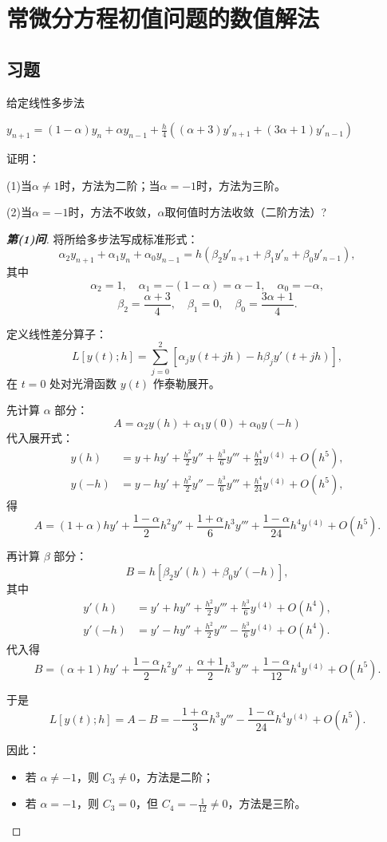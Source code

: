 \documentclass[lang=cn,newtx,12pt,scheme=chinese]{elegantbook}
\begin{document}
\chapter{常微分方程初值问题的数值解法}
\section{习题}
\begin{exercise}
	给定线性多步法
	
	$y_{n+1} =(1-\alpha)y_n+\alpha y_{n-1}+\frac{h}{4}((\alpha+3)y'_{n+1}+(3\alpha+1)y'_{n-1})$
	
	证明：
	
	(1)当$\alpha\neq1$时，方法为二阶；当$\alpha=-1$时，方法为三阶。
	
	(2)当$\alpha=-1$时，方法不收敛，$\alpha$取何值时方法收敛（二阶方法）?
\end{exercise}
\begin{proof}[\textbf{第(1)问}]
	将所给多步法写成标准形式：
	\[
	\alpha_2 y_{n+1} + \alpha_1 y_n + \alpha_0 y_{n-1} = h\left( \beta_2 y'_{n+1} + \beta_1 y'_n + \beta_0 y'_{n-1} \right),
	\]
	其中
	\[
	\alpha_2 = 1,\quad \alpha_1 = -(1-\alpha) = \alpha-1,\quad \alpha_0 = -\alpha,
	\]
	\[
	\beta_2 = \frac{\alpha+3}{4},\quad \beta_1 = 0,\quad \beta_0 = \frac{3\alpha+1}{4}.
	\]
	
	定义线性差分算子：
	\[
	L[y(t);h] = \sum_{j=0}^2 \left[ \alpha_j y(t+jh) - h \beta_j y'(t+jh) \right],
	\]
	在 $t=0$ 处对光滑函数 $y(t)$ 作泰勒展开。
	
	先计算 $\alpha$ 部分：
	\[
	A = \alpha_2 y(h) + \alpha_1 y(0) + \alpha_0 y(-h)
	\]
	代入展开式：
	\begin{align*}
		y(h) &= y + h y' + \frac{h^2}{2} y'' + \frac{h^3}{6} y''' + \frac{h^4}{24} y^{(4)} + O(h^5), \\
		y(-h) &= y - h y' + \frac{h^2}{2} y'' - \frac{h^3}{6} y''' + \frac{h^4}{24} y^{(4)} + O(h^5),
	\end{align*}
	得
	\[
	A = (1+\alpha) h y' + \frac{1-\alpha}{2} h^2 y'' + \frac{1+\alpha}{6} h^3 y''' + \frac{1-\alpha}{24} h^4 y^{(4)} + O(h^5).
	\]
	
	再计算 $\beta$ 部分：
	\[
	B = h\left[ \beta_2 y'(h) + \beta_0 y'(-h) \right],
	\]
	其中
	\begin{align*}
		y'(h) &= y' + h y'' + \frac{h^2}{2} y''' + \frac{h^3}{6} y^{(4)} + O(h^4), \\
		y'(-h) &= y' - h y'' + \frac{h^2}{2} y''' - \frac{h^3}{6} y^{(4)} + O(h^4).
	\end{align*}
	代入得
	\[
	B = (\alpha+1) h y' + \frac{1-\alpha}{2} h^2 y'' + \frac{\alpha+1}{2} h^3 y''' + \frac{1-\alpha}{12} h^4 y^{(4)} + O(h^5).
	\]
	
	于是
	\[
	L[y(t);h] = A - B = -\frac{1+\alpha}{3} h^3 y''' - \frac{1-\alpha}{24} h^4 y^{(4)} + O(h^5).
	\]
	
	因此：
	\begin{itemize}
		\item 若 $\alpha \neq -1$，则 $C_3 \neq 0$，方法是二阶；
		\item 若 $\alpha = -1$，则 $C_3 = 0$，但 $C_4 = -\frac{1}{12} \neq 0$，方法是三阶。
	\end{itemize}
\end{proof}
\end{document}
